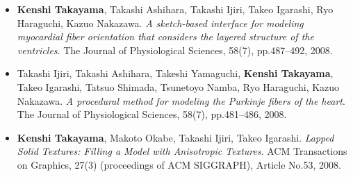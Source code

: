 \begin{itemize}
\item {\bf Kenshi Takayama}, Takashi Ashihara, Takashi Ijiri, Takeo Igarashi, Ryo Haraguchi, Kazuo Nakazawa. {\it A sketch-based interface for modeling myocardial fiber orientation that considers the layered structure of the ventricles}. The Journal of Physiological Sciences, 58(7), pp.487--492, 2008.
\item Takashi Ijiri, Takashi Ashihara, Takeshi Yamaguchi, {\bf Kenshi Takayama}, Takeo Igarashi, Tatsuo Shimada, Tsunetoyo Namba, Ryo Haraguchi, Kazuo Nakazawa. {\it A procedural method for modeling the Purkinje fibers of the heart}. The Journal of Physiological Sciences, 58(7), pp.481--486, 2008.
\item {\bf Kenshi Takayama}, Makoto Okabe, Takashi Ijiri, Takeo Igarashi. {\it Lapped Solid Textures: Filling a Model with Anisotropic Textures}. ACM Transactions on Graphics, 27(3) (proceedings of ACM SIGGRAPH), Article No.53, 2008.
\end{itemize}
